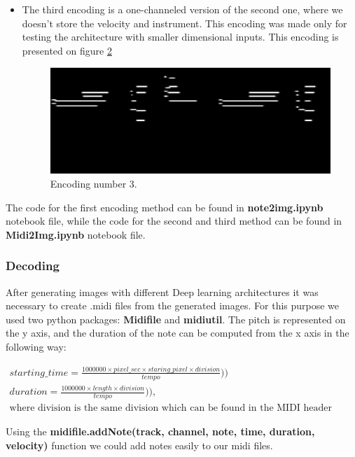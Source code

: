 \documentclass{article}
\begin{document}
\begin{enumerate}
\begin{itemize}
\begin{figure}[!htb]
					\caption{Encoding number 2.}
					\label{fig:encoded-2}
				\end{figure}
			\item The third encoding is a one-channeled version of the second one, where we doesn't store the velocity and instrument. This encoding was made only for testing the architecture with smaller dimensional inputs. This encoding is presented on figure \ref{fig:encoded-3}
				\begin{figure}[!htb]
					\centering
					\includegraphics[width=0.8\linewidth]{encode3.png}
					\caption{Encoding number 3.}
					\label{fig:encoded-3}
				\end{figure}
		\end{itemize}
	\end{enumerate}
	
	The code for the first encoding method can be found in \textbf{note2img.ipynb} notebook file, while the code for the second and third method can be found in \textbf{Midi2Img.ipynb} notebook file.
	\subsubsection{Decoding}
	
	After generating images with different Deep learning architectures it was necessary to create .midi files from the generated images. For this purpose we used two python packages: \textbf{Midifile} and \textbf{midiutil}. The pitch is represented on the y axis, and the duration of the note can be computed from the x axis in the following way: 
	
		\begin{gather}
		starting\_time = \frac{1000000 \times pixel\_sec \times staring\_pixel \times division}{tempo})) \\
		duration = \frac{1000000 \times length \times division}{tempo})), \\
		\text{where division is the same division which can be found in the MIDI header message} \nonumber
		\end{gather}
	
	Using the \textbf{midifile.addNote(track, channel, note, time, duration, velocity)} function we could add notes easily to our midi files. \\ 
	
\end{document}
